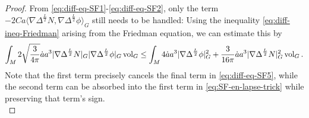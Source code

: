 \documentclass[11pt,leqno,textwidth=10cm]{amsart}
\numberwithin{equation}{section}
\theoremstyle{definition}
\theoremstyle{plain}
\newcommand{\1}{\mathbbm{1}}
\newcommand{\vol}[1]{{\text{\normalfont{vol}}}_{#1}}
\newcommand{\Lap}{\Delta}
\begin{document}
\begin{proof}
From \eqref{eq:diff-eq-SF1}-\eqref{eq:diff-eq-SF2}, only the term $-2Ca\langle\nabla\Lap^{\frac{L}2}N,\nabla\Lap^\frac{L}2\phi\rangle_G$ still needs to be handled: Using the inequality \eqref{eq:diff-ineq-Friedman} arising from the Friedman equation, we can estimate this by
\begin{equation}\label{eq:en-est-SF-Friedman-ineq}
\int_M2\sqrt{\frac{3}{4\pi}}\dot{a}a^3\lvert\nabla\Lap^{\frac{L}2}N\rvert_G\lvert\nabla\Lap^{\frac{L}2}\phi\rvert_G\,\vol{G}\leq \int_M4\dot{a}a^3\lvert\nabla\Lap^\frac{L}2\phi\rvert_G^2+\frac{3}{16\pi}{\dot{a}}a^3\lvert\nabla\Lap^{\frac{L}2} N\rvert_G^2\,\vol{G}\,.
\end{equation}
Note that the first term precisely cancels the final term in \eqref{eq:diff-eq-SF5}, while the second term can be absorbed into the first term in \eqref{eq:SF-en-lapse-trick} while preserving that term's sign.\\


\end{proof}
\end{document}
